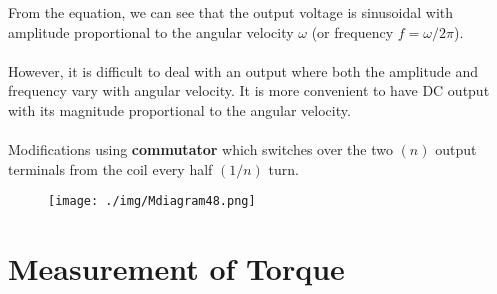 From the equation, we can see that the output voltage is sinusoidal with amplitude proportional to the angular velocity $\omega$ (or frequency $f = \omega/2\pi$). \\\\
However, it is difficult to deal with an output where both the amplitude and frequency vary with angular velocity. It is more convenient to have DC output with its magnitude proportional to the angular velocity. \\\\
Modifications using \textbf{commutator} which switches over the two $(n)$ output terminals from the coil every half $(1/n)$ turn.
\begin{figure}[H]
  \centering
  \texttt{[image: ./img/Mdiagram48.png]}
\end{figure}
\section{Measurement of Torque}
